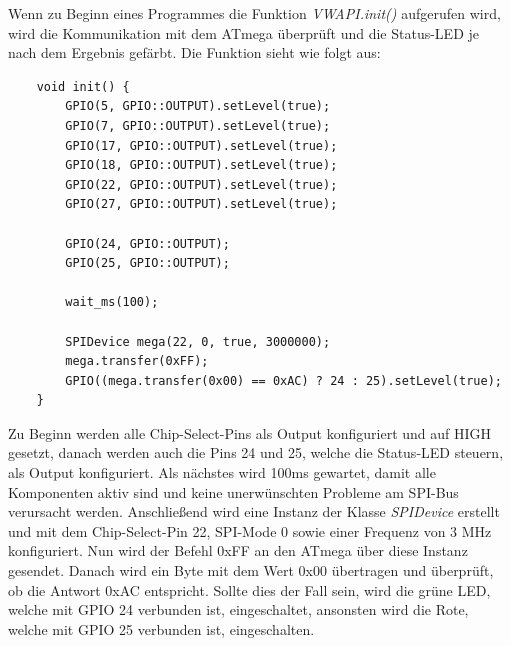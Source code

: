 \documentclass[12pt]{article}
\begin{document}
Wenn zu Beginn eines Programmes die Funktion \textit{VWAPI.init()} aufgerufen wird, wird die Kommunikation mit dem ATmega überprüft und die Status-LED je nach dem Ergebnis gefärbt. Die Funktion sieht wie folgt aus:
\begin{verbatim}
    void init() {
        GPIO(5, GPIO::OUTPUT).setLevel(true);
        GPIO(7, GPIO::OUTPUT).setLevel(true);
        GPIO(17, GPIO::OUTPUT).setLevel(true);
        GPIO(18, GPIO::OUTPUT).setLevel(true);
        GPIO(22, GPIO::OUTPUT).setLevel(true);
        GPIO(27, GPIO::OUTPUT).setLevel(true);

        GPIO(24, GPIO::OUTPUT);
        GPIO(25, GPIO::OUTPUT);

        wait_ms(100);

        SPIDevice mega(22, 0, true, 3000000);
        mega.transfer(0xFF);
        GPIO((mega.transfer(0x00) == 0xAC) ? 24 : 25).setLevel(true);
    }
\end{verbatim}
\vspace{-2mm}
Zu Beginn werden alle Chip-Select-Pins als Output konfiguriert und auf HIGH gesetzt, danach werden auch die Pins 24 und 25, welche die Status-LED steuern, als Output konfiguriert. Als nächstes wird 100ms gewartet, damit alle Komponenten aktiv sind und keine unerwünschten Probleme am SPI-Bus verursacht werden. Anschließend wird eine Instanz der Klasse \textit{SPIDevice} erstellt und mit dem Chip-Select-Pin 22, SPI-Mode 0 sowie einer Frequenz von 3 MHz konfiguriert. Nun wird der Befehl 0xFF an den ATmega über diese Instanz gesendet. Danach wird ein Byte mit dem Wert 0x00 übertragen und überprüft, ob die Antwort 0xAC entspricht. Sollte dies der Fall sein, wird die grüne LED, welche mit GPIO 24 verbunden ist, eingeschaltet, ansonsten wird die Rote, welche mit GPIO 25 verbunden ist, eingeschalten.
\end{document}
